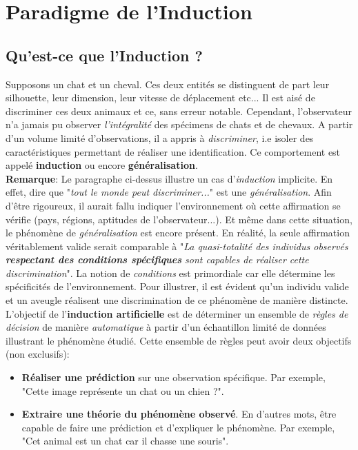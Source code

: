 \section{Paradigme de l'Induction}
\subsection{Qu'est-ce que l'Induction ?}
\noindent Supposons un chat et un cheval. Ces deux entités se distinguent de part leur silhouette, leur dimension, leur vitesse de déplacement etc... Il est aisé de discriminer ces deux animaux et ce, sans erreur notable. Cependant, l'observateur n'a jamais pu observer \textit{l'intégralité} des spécimens de chats et de chevaux. A partir d'un volume limité d'observations, il a appris à \textit{discriminer}, i.e isoler des caractéristiques permettant  de réaliser une identification. Ce comportement est appelé \textbf{induction} ou encore \textbf{généralisation}.\\

\noindent \textbf{Remarque}: Le paragraphe ci-dessus illustre un cas d'\textit{induction} implicite. En effet, dire que "\textit{tout le monde peut discriminer...}" est une \textit{généralisation}. Afin d'être rigoureux, il aurait fallu indiquer l'environnement où cette affirmation se vérifie (pays, régions, aptitudes de l'observateur...). Et même dans cette situation, le phénomène de \textit{généralisation} est encore présent. En réalité, la seule affirmation véritablement valide serait comparable à "\textit{La quasi-totalité des individus observés \textbf{respectant des conditions spécifiques} sont capables de réaliser cette discrimination}". La notion de \textit{conditions} est primordiale car elle détermine les spécificités de l'environnement. Pour illustrer, il est évident qu'un individu valide et un aveugle réalisent une discrimination de ce phénomène de manière distincte.\\

\noindent L'objectif de l'\textbf{induction artificielle} est de déterminer un ensemble de  \textit{règles de décision} de manière \textit{automatique} à partir d'un échantillon limité de données illustrant le phénomène étudié. Cette ensemble de règles peut avoir deux objectifs (non exclusifs):
\begin{itemize}
    \item \textbf{Réaliser une prédiction} sur une observation spécifique. Par exemple, "Cette image représente un chat ou un chien ?".

    \item \textbf{Extraire une théorie du phénomène observé}. En d'autres mots, être capable de faire une prédiction et d'expliquer le phénomène. Par exemple, "Cet animal est un chat car il chasse une souris".
\end{itemize}


